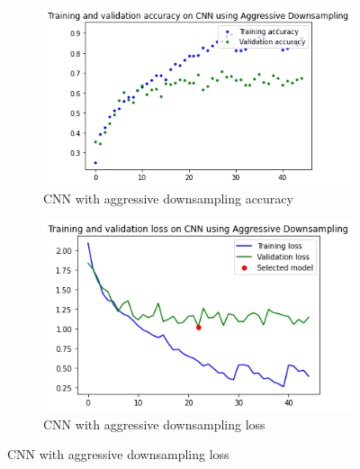\begin{figure}[H]
	\begin{subfigure}{0.5\textwidth}
		\includegraphics[width=0.9\linewidth]{img/scratch/aggressive_downsampling_acc.png} 
		\caption{CNN with aggressive downsampling accuracy}
		\label{fig:AggressiveDownsamplingacc}
	\end{subfigure}
	\begin{subfigure}{0.5\textwidth}
		\includegraphics[width=0.9\linewidth]{img/scratch/aggressive_downsampling_loss.png}
		\caption{CNN with aggressive downsampling loss}
		\label{fig:AggressiveDownsamplingloss}
	\end{subfigure}
\end{figure}

\medskip

